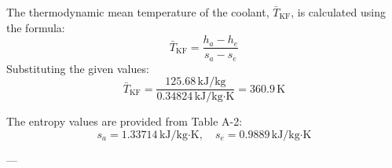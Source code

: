 The thermodynamic mean temperature of the coolant, \( \bar{T}_{\text{KF}} \), is calculated using the formula:  
\[
\bar{T}_{\text{KF}} = \frac{h_a - h_e}{s_a - s_e}
\]  
Substituting the given values:  
\[
\bar{T}_{\text{KF}} = \frac{125.68 \, \text{kJ/kg}}{0.34824 \, \text{kJ/kg·K}} = 360.9 \, \text{K}
\]  

The entropy values are provided from Table A-2:  
\[
s_a = 1.33714 \, \text{kJ/kg·K}, \quad s_e = 0.9889 \, \text{kJ/kg·K}
\]  

---
